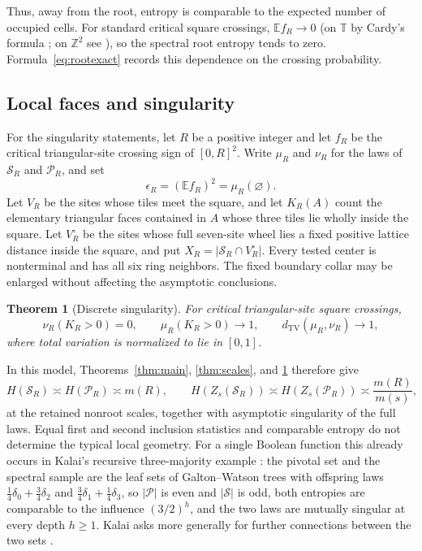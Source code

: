 \documentclass[11pt]{amsart}
\newtheorem{theorem}{Theorem}[section]
\theoremstyle{remark}
\newcommand{\E}{\mathbb E}
\newcommand{\cS}{\mathcal S}
\newcommand{\cP}{\mathcal P}
\newcommand{\TV}{d_{\mathrm{TV}}}
\begin{document}
Thus, away from the root, entropy is comparable to the expected number
of occupied cells. For standard critical square crossings,
$\E f_R\to0$ (on $\mathbb T$ by Cardy's formula \cite{Smirnov}; on $\mathbb Z^2$ see \cite[Section~1.3]{GPS}), so the spectral root entropy tends
to zero. Formula~\eqref{eq:rootexact} records this dependence on the
crossing probability.

\subsection{Local faces and singularity}

For the singularity statements, let $R$ be a positive integer and let $f_R$ be the critical triangular-site crossing sign of $[0,R]^2$. Write $\mu_R$ and $\nu_R$ for the laws of $\cS_R$ and $\cP_R$, and set
\[
 \epsilon_R=(\E f_R)^2=\mu_R(\varnothing).
\]
Let $V_R$ be the sites whose tiles meet the square, and let $K_R(A)$ count the elementary triangular faces contained in $A$ whose three tiles lie wholly inside the square. Let $V_R^\circ$ be the sites whose full seven-site wheel lies a fixed positive lattice distance inside the square, and put $X_R=|\cS_R\cap V_R^\circ|$. Every tested center is nonterminal and has all six ring neighbors. The fixed boundary collar may be enlarged without affecting the asymptotic conclusions.

\begin{theorem}[Discrete singularity]\label{thm:discrete}
For critical triangular-site square crossings,
\[
 \nu_R(K_R>0)=0,\qquad \mu_R(K_R>0)\longrightarrow1,
 \qquad \TV(\mu_R,\nu_R)\longrightarrow1,
\]
where total variation is normalized to lie in $[0,1]$.
\end{theorem}

In this model, Theorems~\ref{thm:main}, \ref{thm:scales}, and \ref{thm:discrete} therefore give
\[
 H(\cS_R)\asymp H(\cP_R)\asymp m(R),\qquad
 H(Z_s(\cS_R))\asymp H(Z_s(\cP_R))\asymp\frac{m(R)}{m(s)},
\]
at the retained nonroot scales, together with asymptotic singularity of the full laws. Equal first and second inclusion statistics and comparable entropy do not determine the typical local geometry. For a single Boolean function this already occurs in Kalai's recursive three-majority example \cite[slide~22]{Pete}: the pivotal set and the spectral sample are the leaf sets of Galton--Watson trees with offspring laws $\frac14\delta_0+\frac34\delta_2$ and $\frac34\delta_1+\frac14\delta_3$, so $|\cP|$ is even and $|\cS|$ is odd, both entropies are comparable to the influence $(3/2)^h$, and the two laws are mutually singular at every depth $h\ge1$. Kalai asks more generally for further connections between the two sets \cite[Problem~7]{Kalai}.
\end{document}
